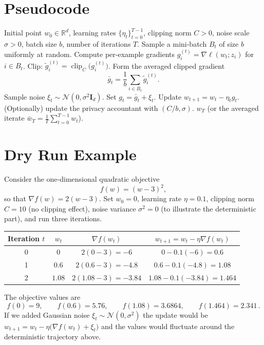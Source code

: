 \documentclass{article}
\begin{document}
\section*{Pseudocode}
\begin{algorithm}[H]
\caption{DP‑SGD\_G}
\begin{algorithmic}[1]
\REQUIRE Initial point $w_0\in\mathbb{R}^d$, learning rates $\{\eta_t\}_{t=0}^{T-1}$, clipping norm $C>0$, noise scale $\sigma>0$, batch size $b$, number of iterations $T$.
    \STATE Sample a mini‑batch $B_t$ of size $b$ uniformly at random.
    \STATE Compute per‑example gradients $g_i^{(t)}=\nabla\ell(w_t;z_i)$ for $i\in B_t$.
    \STATE Clip: $\tilde g_i^{(t)}=\operatorname{clip}_C\!\bigl(g_i^{(t)}\bigr)$.
    \STATE Form the averaged clipped gradient
          \[
          \bar g_t=\frac{1}{b}\sum_{i\in B_t}\tilde g_i^{(t)} .
          \]
    \STATE Sample noise $\xi_t\sim\mathcal{N}(0,\sigma^{2}\mathbf{I}_d)$.
    \STATE Set $g_t=\bar g_t+\xi_t$.
    \STATE Update $w_{t+1}=w_t-\eta_t g_t$.
    \STATE (Optionally) update the privacy accountant with $(C/b,\sigma)$.
\ENDFOR
\RETURN $w_T$ (or the averaged iterate $\bar w_T=\frac{1}{T}\sum_{t=0}^{T-1}w_t$).
\end{algorithmic}
\end{algorithm}

\bigskip

\section*{Dry Run Example}
Consider the one‑dimensional quadratic objective
\[
f(w)=(w-3)^2,
\]
so that $\nabla f(w)=2(w-3)$.  
Set $w_0=0$, learning rate $\eta=0.1$, clipping norm $C=10$ (no clipping effect), noise variance $\sigma^2=0$ (to illustrate the deterministic part), and run three iterations.

\begin{center}
\begin{tabular}{c|c|c|c}
Iteration $t$ & $w_t$ & $\nabla f(w_t)$ & $w_{t+1}=w_t-\eta\nabla f(w_t)$ \\ \hline
0 & $0$ & $2(0-3)=-6$ & $0-0.1(-6)=0.6$ \\
1 & $0.6$ & $2(0.6-3)=-4.8$ & $0.6-0.1(-4.8)=1.08$ \\
2 & $1.08$ & $2(1.08-3)=-3.84$ & $1.08-0.1(-3.84)=1.464$ \\
\end{tabular}
\end{center}

The objective values are
\[
f(0)=9,\qquad f(0.6)=5.76,\qquad f(1.08)=3.6864,\qquad f(1.464)=2.341\,.
\]
If we added Gaussian noise $\xi_t\sim\mathcal{N}(0,\sigma^2)$ the update would be $w_{t+1}=w_t-\eta\bigl(\nabla f(w_t)+\xi_t\bigr)$ and the values would fluctuate around the deterministic trajectory above.
\end{document}
